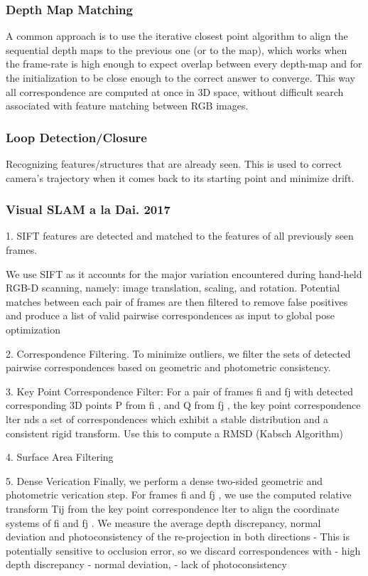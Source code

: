 \subsubsection{Depth Map Matching}

A common approach is to use the iterative closest point algorithm to align the sequential depth maps to the previous one (or to the map), which works when the frame-rate is high enough to expect overlap between every depth-map and for the initialization to be close enough to the correct answer to converge. This way all correspondence are computed at once in 3D space, without difficult search associated with feature matching between RGB images.

\subsubsection{Loop Detection/Closure}

Recognizing features/structures that are already seen. This is used to correct camera's trajectory when it comes back to its starting point and minimize drift.

\subsubsection{Visual SLAM a la Dai. 2017}

1. SIFT features are detected and matched to the features of all previously seen frames. 

We use SIFT as it accounts for the major variation encountered during hand-held RGB-D scanning, namely: image translation, scaling, and rotation. Potential matches between each pair of frames are then filtered to remove false positives and produce a list of valid pairwise correspondences as input to global pose optimization

2. Correspondence Filtering. To minimize outliers, we filter the sets of detected pairwise correspondences based on geometric and photometric consistency.

3. Key Point Correspondence Filter: For a pair of frames fi and fj with detected corresponding 3D points P from fi , and Q from fj , the key point correspondence lter nds a set of correspondences which exhibit a stable distribution and a consistent rigid transform. Use this to compute a RMSD (Kabsch Algorithm)

4. Surface Area Filtering

5. Dense Verication Finally, we perform a dense two-sided geometric and photometric verication step. For frames fi and fj , we use the computed relative transform Tij from the key point correspondence lter to align the coordinate systems of fi and fj . We measure the average depth discrepancy, normal deviation and photoconsistency of the re-projection in both directions
   - This is potentially sensitive to occlusion error, so we discard correspondences with 
   - high depth discrepancy
   - normal deviation,
   - lack of photoconsistency

